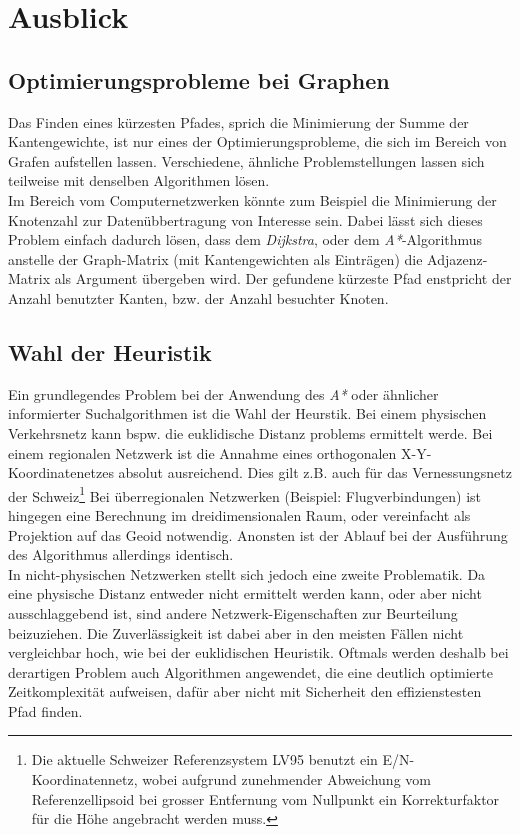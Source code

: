 \section{Ausblick}
\subsection{Optimierungsprobleme bei Graphen}
Das Finden eines kürzesten Pfades, sprich die Minimierung der Summe der Kantengewichte, ist nur eines der Optimierungsprobleme, die sich im Bereich von Grafen aufstellen lassen. Verschiedene, ähnliche Problemstellungen lassen sich teilweise mit denselben Algorithmen lösen.\\
Im Bereich vom Computernetzwerken könnte zum Beispiel die Minimierung der Knotenzahl zur Datenübbertragung von Interesse sein. Dabei lässt sich dieses Problem einfach dadurch lösen, dass dem \emph{Dijkstra}, oder dem \emph{A*}-Algorithmus anstelle der Graph-Matrix (mit Kantengewichten als Einträgen) die Adjazenz-Matrix als Argument übergeben wird. Der gefundene kürzeste Pfad enstpricht der Anzahl benutzter Kanten, bzw. der Anzahl besuchter Knoten.  

\subsection{Wahl der Heuristik}
Ein grundlegendes Problem bei der Anwendung des \emph{A*} oder ähnlicher informierter Suchalgorithmen ist die Wahl der Heurstik. Bei einem physischen Verkehrsnetz kann bspw. die euklidische Distanz problems ermittelt werde. Bei einem regionalen Netzwerk ist die Annahme eines orthogonalen X-Y-Koordinatenetzes absolut ausreichend. Dies gilt z.B. auch für das Vernessungsnetz der Schweiz\footnote{Die aktuelle Schweizer Referenzsystem LV95 benutzt ein E/N-Koordinatennetz, wobei aufgrund zunehmender Abweichung vom Referenzellipsoid bei grosser Entfernung vom Nullpunkt ein Korrekturfaktor für die Höhe angebracht werden muss.} Bei überregionalen Netzwerken (Beispiel: Flugverbindungen) ist hingegen eine Berechnung im dreidimensionalen Raum, oder vereinfacht als Projektion auf das Geoid notwendig. Anonsten ist der Ablauf bei der Ausführung des Algorithmus allerdings identisch.\\
In nicht-physischen Netzwerken stellt sich jedoch eine zweite Problematik. Da eine physische Distanz entweder nicht ermittelt werden kann, oder aber nicht ausschlaggebend ist, sind andere Netzwerk-Eigenschaften zur Beurteilung beizuziehen. Die Zuverlässigkeit ist dabei aber in den meisten Fällen nicht vergleichbar hoch, wie bei der euklidischen Heuristik. Oftmals werden deshalb bei derartigen Problem auch Algorithmen angewendet, die eine deutlich optimierte Zeitkomplexität aufweisen, dafür aber nicht mit Sicherheit den effizienstesten Pfad finden.

